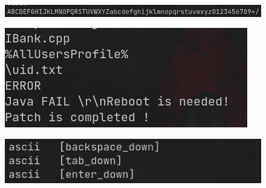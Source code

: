 \documentclass[10pt,a4paper]{article}
\begin{document}
	\begin{figure}[!htbp]%
		\centering
		\includegraphics[width=\columnwidth]{pics/sus9.png}
	\end{figure}
	\begin{figure}[!htbp]%
		\centering
		\includegraphics[width=\columnwidth]{pics/sus10.png}
	\end{figure}
	\begin{figure}[!htbp]%
		\centering
		\includegraphics[width=\columnwidth]{pics/sus11.png}
	\end{figure}
\end{document}
